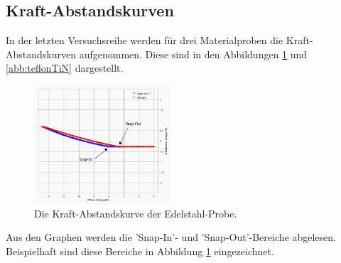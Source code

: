 \subsection{Kraft-Abstandskurven}
In der letzten Versuchsreihe werden f\"ur drei Materialproben die Kraft-Abstandskurven aufgenommen.
Diese sind in den Abbildungen \ref{abb:edelstahl} und \ref{abb:teflonTiN} dargestellt.
\begin{figure}[hbtp]
	\centering
	\includegraphics[width=0.45\textwidth]{AFM_auswertung/edelstahl_pfeile.png}
	\caption{Die Kraft-Abstandskurve der Edelstahl-Probe.}
\label{abb:edelstahl}
\end{figure}
Aus den Graphen werden die 'Snap-In'- und 'Snap-Out'-Bereiche abgelesen.
Beispielhaft sind diese Bereiche in Abbildung \ref{abb:edelstahl} eingezeichnet.
